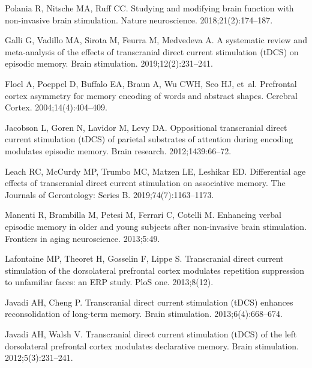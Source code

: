 \documentclass[10pt,letterpaper]{article}
\begin{document}
\begin{thebibliography}{10}

Polania R, Nitsche MA, Ruff CC.
\newblock Studying and modifying brain function with non-invasive brain
  stimulation.
\newblock Nature neuroscience. 2018;21(2):174--187.

Galli G, Vadillo MA, Sirota M, Feurra M, Medvedeva A.
\newblock A systematic review and meta-analysis of the effects of transcranial
  direct current stimulation (tDCS) on episodic memory.
\newblock Brain stimulation. 2019;12(2):231--241.

Floel A, Poeppel D, Buffalo EA, Braun A, Wu CWH, Seo HJ, et~al.
\newblock Prefrontal cortex asymmetry for memory encoding of words and abstract
  shapes.
\newblock Cerebral Cortex. 2004;14(4):404--409.

Jacobson L, Goren N, Lavidor M, Levy DA.
\newblock Oppositional transcranial direct current stimulation (tDCS) of
  parietal substrates of attention during encoding modulates episodic memory.
\newblock Brain research. 2012;1439:66--72.

Leach RC, McCurdy MP, Trumbo MC, Matzen LE, Leshikar ED.
\newblock Differential age effects of transcranial direct current stimulation
  on associative memory.
\newblock The Journals of Gerontology: Series B. 2019;74(7):1163--1173.

Manenti R, Brambilla M, Petesi M, Ferrari C, Cotelli M.
\newblock Enhancing verbal episodic memory in older and young subjects after
  non-invasive brain stimulation.
\newblock Frontiers in aging neuroscience. 2013;5:49.

Lafontaine MP, Theoret H, Gosselin F, Lippe S.
\newblock Transcranial direct current stimulation of the dorsolateral
  prefrontal cortex modulates repetition suppression to unfamiliar faces: an
  ERP study.
\newblock PloS one. 2013;8(12).

Javadi AH, Cheng P.
\newblock Transcranial direct current stimulation (tDCS) enhances
  reconsolidation of long-term memory.
\newblock Brain stimulation. 2013;6(4):668--674.

Javadi AH, Walsh V.
\newblock Transcranial direct current stimulation (tDCS) of the left
  dorsolateral prefrontal cortex modulates declarative memory.
\newblock Brain stimulation. 2012;5(3):231--241.


\end{thebibliography}
\end{document}
